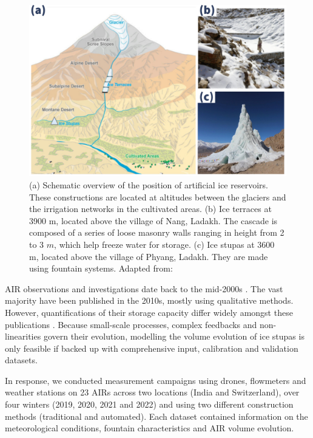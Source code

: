 \documentclass[tc]{copernicus}
\begin{document}
\begin{figure}[t]
\centering
\includegraphics[width=\columnwidth]{figs/AIR_forms.jpg}

\caption{(a) Schematic overview of the position of artificial ice reservoirs. These constructions are located at
  altitudes between the glaciers and the irrigation networks in the cultivated areas. (b) Ice terraces at 3900
  m, located above the village of Nang, Ladakh. The cascade is composed of a series of loose masonry walls
  ranging in height from 2 to 3 $m$, which help freeze water for storage. (c) Ice stupas at 3600 m, located
above the village of Phyang, Ladakh. They are made using fountain systems. Adapted from:
\cite{nusserLocalKnowledgeGlobal2016}}

\label{fig:AIRforms}
\end{figure}

AIR observations and investigations date back to the mid-2000s \citep{tveitenGlacierGrowingLocal2007}. The vast
majority have been published in the 2010s, mostly using qualitative methods. However, quantifications of their
storage capacity differ widely amongst these publications \citep{baglaArtificialGlaciersHelp1998,
norphelSnowWaterHarvesting2015, nusserSociohydrologyArtificialGlaciers2019}. Because small-scale processes,
complex feedbacks and non-linearities govern their evolution, modelling the volume evolution of ice stupas is
only feasible if backed up with comprehensive input, calibration and validation datasets.

In response, we conducted measurement campaigns using drones, flowmeters and weather stations on 23 AIRs across
two locations (India and Switzerland), over four winters (2019, 2020, 2021 and 2022) and using two different
construction methods (traditional and automated). Each dataset contained information on the meteorological
conditions, fountain characteristics and AIR volume evolution. 
\end{document}
